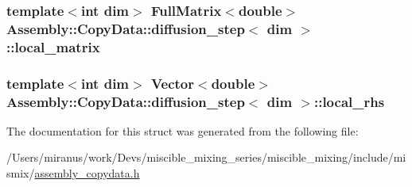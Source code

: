 \subsubsection[{local\+\_\+matrix}]{\setlength{\rightskip}{0pt plus 5cm}template$<$int dim$>$ Full\+Matrix$<$double$>$ {\bf Assembly\+::\+Copy\+Data\+::diffusion\+\_\+step}$<$ dim $>$\+::local\+\_\+matrix}\label{struct_assembly_1_1_copy_data_1_1diffusion__step_ab71ebe2d993b5db8353c7285e2759325}
\hypertarget{struct_assembly_1_1_copy_data_1_1diffusion__step_ad5d3185b59f3f5c8b56727c7f7722390}{}
\subsubsection[{local\+\_\+rhs}]{\setlength{\rightskip}{0pt plus 5cm}template$<$int dim$>$ Vector$<$double$>$ {\bf Assembly\+::\+Copy\+Data\+::diffusion\+\_\+step}$<$ dim $>$\+::local\+\_\+rhs}\label{struct_assembly_1_1_copy_data_1_1diffusion__step_ad5d3185b59f3f5c8b56727c7f7722390}


The documentation for this struct was generated from the following file\+:\begin{DoxyCompactItemize}
\item 
/\+Users/miranus/work/\+Devs/miscible\+\_\+mixing\+\_\+series/miscible\+\_\+mixing/include/mismix/\hyperlink{assembly__copydata_8h}{assembly\+\_\+copydata.\+h}\end{DoxyCompactItemize}
